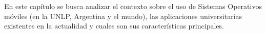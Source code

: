 
En este capítulo se busca analizar el contexto sobre el uso de Sistemas Operativos móviles (en la UNLP, Argentina y el mundo), las aplicaciones universitarias existentes en la actualidad y cuales son sus características principales.